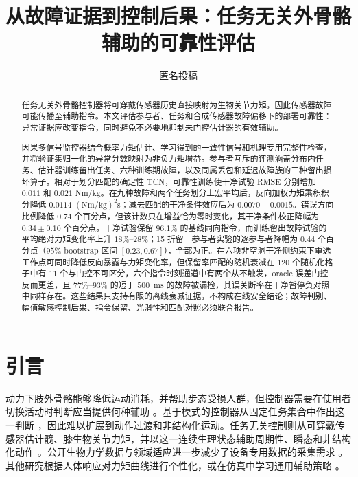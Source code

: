 \documentclass[UTF8]{ctexart}
\title{从故障证据到控制后果：任务无关外骨骼辅助的可靠性评估}
\author{匿名投稿}
\date{}
\begin{document}
\maketitle

\begin{abstract}
任务无关外骨骼控制器将可穿戴传感器历史直接映射为生物关节力矩，因此传感器故障可能传播至辅助指令。本文评估参与者、任务和合成传感器故障偏移下的部署可靠性：异常证据应改变指令，同时避免不必要地抑制未门控估计器的有效辅助。

因果多信号监控器结合概率力矩估计、学习得到的一致性信号和机理专用完整性检查，并将验证集归一化的异常分数映射为非负力矩增益。参与者互斥的评测涵盖分布内任务、估计器训练留出任务、六种训练期故障，以及同属丢包和延迟故障族的三种留出损坏算子。相对于划分匹配的确定性 TCN，可靠性训练使干净试验 RMSE 分别增加 $0.011$ 和 $0.021$ Nm/kg。在九种故障和两个任务划分上宏平均后，反向加权力矩乘积积分降低 $0.0114$ $(\mathrm{Nm/kg})^2\mathrm{s}$；减去匹配的干净条件效应后为 $0.0070\pm0.0015$。错误方向比例降低 $0.74$ 个百分点，但该计数只在增益恰为零时变化，其干净条件校正降幅为 $0.34\pm0.10$ 个百分点。干净试验保留 $96.1\%$ 的基线同向指令，而训练留出故障试验的平均绝对力矩变化率上升 $18\%$--$28\%$；15 折留一参与者实验的逐参与者降幅为 $0.44$ 个百分点（$95\%$ bootstrap 区间 $[0.23,0.67]$），全部为正。在六项非空洞干净侧约束下重选工作点可同时降低反向暴露与力矩变化率，但保留率匹配的随机衰减在 $120$ 个随机化格子中有 $11$ 个与门控不可区分，六个指令时刻通道中有两个从不触发，oracle 误差门控反而更差，且 $77\%$--$93\%$ 的短于 $500$~ms 的故障被漏检，其误关断率在干净暂停负对照中同样存在。这些结果只支持有限的离线衰减证据，不构成在线安全结论；故障判别、幅值敏感控制后果、指令保留、光滑性和匹配对照必须联合报告。
\end{abstract}

\section{引言}

动力下肢外骨骼能够降低运动消耗，并帮助步态受损人群，但控制器需要在使用者切换活动时判断应当提供何种辅助 \citep{young2017state,kim2019exosuit,awad2017soft,siviy2023opportunities}。基于模式的控制器从固定任务集合中作出这一判断 \citep{camargo2021classification,kang2022classification}，因此难以扩展到动作过渡和非结构化运动。任务无关控制则从可穿戴传感器估计髋、膝生物关节力矩，并以这一连续生理状态辅助周期性、瞬态和非结构化动作 \citep{molinaro2022hip,molinaro2024unifies,molinaro2024task}。公开生物力学数据与领域适应进一步减少了设备专用数据的采集需求 \citep{scherpereel2023dataset,scherpereel2025domain}。其他研究根据人体响应对力矩曲线进行个性化，或在仿真中学习通用辅助策略 \citep{zhang2017humanloop,slade2022personalizing,luo2024simulation}。
\end{document}
